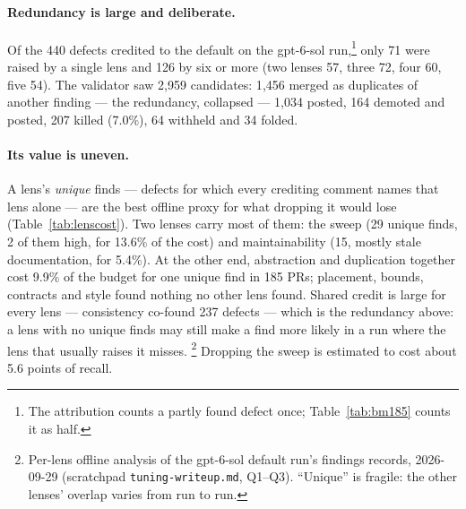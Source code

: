 \documentclass[11pt,a4paper]{article}
\newcommand{\code}[1]{\texttt{#1}}
\begin{document}
\paragraph{Redundancy is large and deliberate.} Of the 440 defects credited
to the default on the gpt-6-sol run,\footnote{The attribution counts a
partly found defect once; Table~\ref{tab:bm185} counts it as half.} only 71
were raised by a single lens and 126 by six or more (two lenses 57, three
72, four 60, five 54). The validator saw 2{,}959 candidates: 1{,}456 merged
as duplicates of another finding --- the redundancy, collapsed --- 1{,}034
posted, 164 demoted and posted, 207 killed (7.0\%), 64 withheld and 34
folded.

\paragraph{Its value is uneven.} A lens's \emph{unique} finds --- defects
for which every crediting comment names that lens alone --- are the best
offline proxy for what dropping it would lose (Table~\ref{tab:lenscost}).
Two lenses carry most of them: the sweep (29 unique finds, 2 of them high,
for 13.6\% of the cost) and maintainability (15, mostly stale documentation,
for 5.4\%). At the other end, abstraction and duplication together cost
9.9\% of the budget for one unique find in 185 PRs; placement, bounds,
contracts and style found nothing no other lens found. Shared credit is
large for every lens --- consistency co-found 237 defects --- which is the
redundancy above: a lens with no unique finds may still make a find more
likely in a run where the lens that usually raises it misses.
\footnote{Per-lens offline analysis of the gpt-6-sol default run's findings
records, 2026-09-29 (scratchpad \code{tuning-writeup.md}, Q1--Q3). ``Unique''
is fragile: the other lenses' overlap varies from run to run.} Dropping the
sweep is estimated to cost about 5.6 points of recall.
\end{document}

